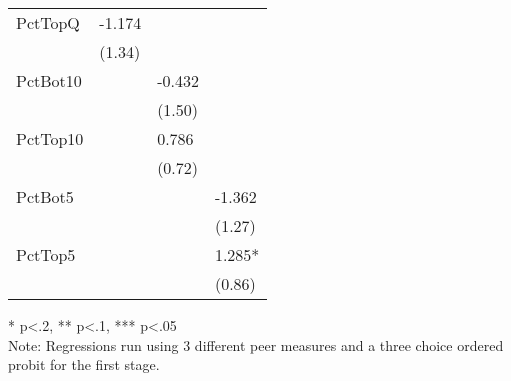 \begin{table}[htb]
\begin{threeparttable}
\begin{tabular}{l l l l}
      PctTopQ  & -1.174                        &                               &                              \\
               & (1.34)                        &                               &                              \\
      PctBot10 &                               & -0.432                        &                              \\
               &                               & (1.50)                        &                              \\
      PctTop10 &                               & 0.786                         &                              \\
               &                               & (0.72)                        &                              \\
      PctBot5  &                               &                               & -1.362                       \\
               &                               &                               & (1.27)                       \\
      PctTop5  &                               &                               & 1.285*                       \\
               &                               &                               & (0.86)                       \\
      \hline
      \hline
    \end{tabular}
    \begin{tablenotes}
    \item{* p<.2, ** p<.1, *** p<.05 \\Note: Regressions run using 3 different peer measures and a three choice ordered probit for the first stage.}
    \end{tablenotes}
    \centering
  \end{threeparttable}
\end{table}

\clearpage{}


